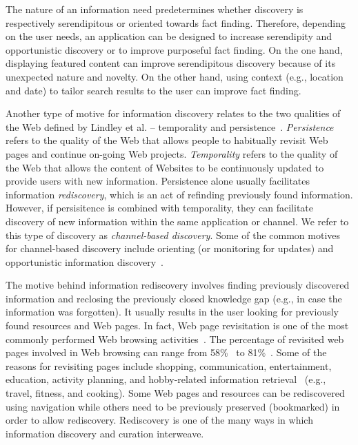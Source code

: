 \documentclass{sigchi}
\begin{document}
{{{The nature of an information need predetermines whether discovery is respectively serendipitous or oriented towards fact finding. Therefore, depending on the user needs, an application can be designed to increase serendipity and opportunistic discovery or to improve purposeful fact finding. On the one hand, displaying featured content can improve serendipitous discovery because of its unexpected nature and novelty. On the other hand, using context (e.g., location and date) to tailor search results to the user can improve fact finding. 

Another type of motive for information discovery relates to the two qualities of the Web defined by Lindley et al. -- temporality and persistence~\cite{lindley2012s}. \textit{Persistence} refers to the quality of the Web that allows people to habitually revisit Web pages and continue on-going Web projects. \textit{Temporality} refers to the quality of the Web that allows the content of Websites to be continuously updated to provide users with new information. Persistence alone usually facilitates information \textit{rediscovery}, which is an act of refinding previously found information. However, if persisitence is combined with temporality, they can facilitate discovery of new information within the same application or channel. We refer to this type of discovery as \textit{channel-based discovery}. Some of the common motives for channel-based discovery include orienting (or monitoring for updates) and opportunistic information discovery~\cite{lindley2012s}.          

The motive behind information rediscovery involves finding previously discovered information and reclosing the previously closed knowledge gap (e.g., in case the information was forgotten). It usually results in the user looking for previously found resources and Web pages. In fact, Web page revisitation is one of the most commonly performed Web browsing activities~\cite{adar2008large,cockburn2003improving}. The percentage of revisited web pages involved in Web browsing can range from 58\%~\cite{tauscher1997people} to 81\%~\cite{cockburn2001web}. Some of the reasons for revisiting pages include shopping, communication, entertainment, education, activity planning, and hobby-related information retrieval~\cite{adar2008large} (e.g., travel, fitness, and cooking). Some Web pages and resources can be rediscovered using navigation while others need to be previously preserved (bookmarked) in order to allow rediscovery. Rediscovery is one of the many ways in which information discovery and curation interweave. 
}

}}
\end{document}
